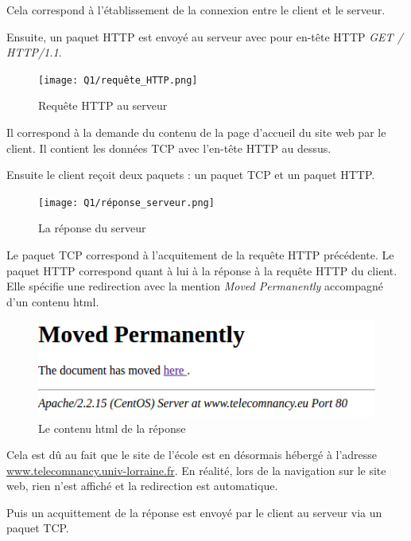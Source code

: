 \documentclass[12 pt,a4paper,frenchb]{article}
\begin{document}
Cela correspond à l'établissement de la connexion entre le client et le serveur.

Ensuite, un paquet HTTP est envoyé au serveur avec pour en-tête HTTP \textit{GET / HTTP/1.1}.
\vspace{1cm}

\begin{figure}[h]
  \centering
  \texttt{[image: Q1/requête\_HTTP.png]}
  \caption{Requête HTTP au serveur}
\end{figure}
\vspace{1cm}

Il correspond à la demande du contenu de la page d'accueil du site web par le client. Il contient les données TCP avec l'en-tête HTTP au dessus.

Ensuite le client reçoit deux paquets : un paquet TCP et un paquet HTTP.
\vspace{1cm}

\begin{figure}[h]
  \centering
  \texttt{[image: Q1/réponse\_serveur.png]}
  \caption{La réponse du serveur}
\end{figure}
\vspace{1cm}

Le paquet TCP correspond à l'acquitement de la requête HTTP précédente. Le paquet HTTP correspond quant à lui à la réponse à la requête HTTP du client. Elle spécifie une redirection avec la mention \textit{Moved Permanently} accompagné d'un contenu html.

\begin{figure}[h]
  \centering
  \includegraphics[scale=0.8]{Q1/contenu_html.png}
  \caption{Le contenu html de la réponse}
\end{figure}
\vspace{1cm}

Cela est dû au fait que le site de l'école est en désormais hébergé à l'adresse \url{www.telecomnancy.univ-lorraine.fr}. En réalité, lors de la navigation sur le site web, rien n'est affiché et la redirection est automatique.

Puis un acquittement de la réponse est envoyé par le client au serveur via un paquet TCP.
\end{document}
